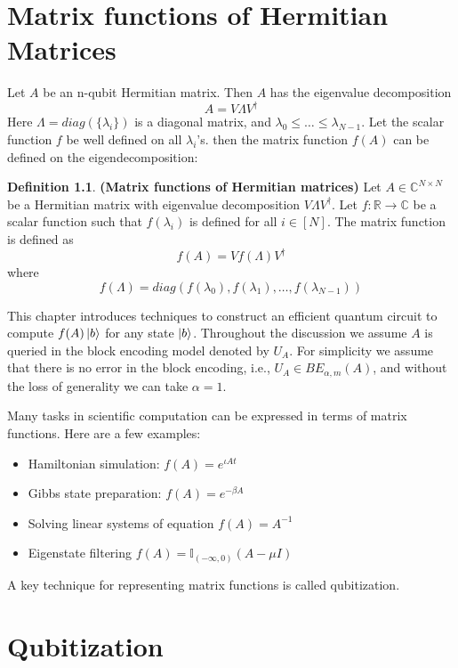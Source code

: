 \documentclass[12pt, oneside]{book}
\theoremstyle{definition}
\newtheorem{definition}{Definition}[section]
\theoremstyle{definition}
\theoremstyle{remark}
\begin{document}
\chapter{Matrix functions of Hermitian Matrices}
Let $A$ be an n-qubit Hermitian matrix. Then $A$ has the eigenvalue decomposition
\[
A=V\Lambda V^{\dagger}
\]
Here $\Lambda=diag(\{\lambda_i\})$ is a diagonal matrix, and $\lambda_0\leq \ldots \leq \lambda_{N-1}$. Let the scalar function $f$ be well defined on all $\lambda_i$'s. then the matrix function $f(A)$ can be defined on the eigendecomposition:
\begin{definition}
    \textbf{(Matrix functions of Hermitian matrices)} Let $A \in \mathbb{C}^{N \times N}$ be a Hermitian matrix with eigenvalue decomposition $V\Lambda V^{\dagger}$. Let $f:\mathbb{R} \rightarrow \mathbb{C}$ be a scalar function such that $f(\lambda_i)$ is defined for all $i\in[N]$. The matrix function is defined as
    \[
    f(A)=Vf(\Lambda)V^{\dagger}
    \]
    where 
    \[
    f(\Lambda)=diag(f(\lambda_0),f(\lambda_1),\ldots,f(\lambda_{N-1}))
    \]
\end{definition}

This chapter introduces techniques to construct an efficient quantum circuit to compute $f(A)\ket{b}$ for any state $\ket{b}$. Throughout the discussion we assume $A$ is queried in the block encoding model denoted by $U_A$. For simplicity we assume that there is no error in the block encoding, i.e., $U_A \in BE_{\alpha,m} (A)$, and without the loss of generality we can take $\alpha=1$.

Many tasks in scientific computation can be expressed in terms of matrix functions. Here are a few examples:
\begin{itemize}
    \item Hamiltonian simulation: $f(A)=e^{\iota At}$
    \item Gibbs state preparation: $f(A)=e^{- \beta A}$
    \item Solving linear systems of equation $f(A)=A^{-1}$
    \item Eigenstate filtering $f(A)=\mathbb{I}_{(-\infty,0)}(A-\mu I)$
\end{itemize}
A key technique for representing matrix functions is called qubitization.

\chapter{Qubitization}
\end{document}
